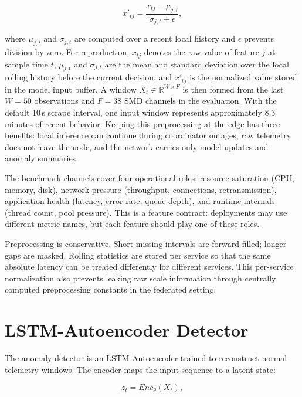 \begin{equation}
    x'_{tj} = \frac{x_{tj} - \mu_{j,t}}{\sigma_{j,t} + \epsilon},
    \label{eq:local_normalization}
\end{equation}

where $\mu_{j,t}$ and $\sigma_{j,t}$ are computed over a recent local history
and $\epsilon$ prevents division by zero. For reproduction, $x_{tj}$ denotes
the raw value of feature $j$ at sample time $t$, $\mu_{j,t}$ and
$\sigma_{j,t}$ are the mean and standard deviation over the local rolling
history before the current decision, and $x'_{tj}$ is the normalized value
stored in the model input buffer. A window
$X_t \in \mathbb{R}^{W \times F}$ is then formed from the last $W=50$
observations and $F=38$ SMD channels in the evaluation. With the default 10\,s
scrape interval, one input window represents approximately 8.3 minutes of recent
behavior. Keeping this preprocessing at the edge has three benefits: local
inference can continue during coordinator outages, raw telemetry does not leave
the node, and the network carries only model updates and anomaly summaries.

The benchmark channels cover four operational roles: resource saturation (CPU,
memory, disk), network pressure (throughput, connections, retransmission),
application health (latency, error rate, queue depth), and runtime internals
(thread count, pool pressure). This is a feature contract: deployments may use
different metric names, but each feature should play one of these roles.

Preprocessing is conservative. Short missing intervals are forward-filled;
longer gaps are masked. Rolling statistics are stored per service so that the
same absolute latency can be treated differently for different services. This
per-service normalization also prevents leaking raw scale information through
centrally computed preprocessing constants in the federated setting.

\section{LSTM-Autoencoder Detector}
\label{sec:method_lstm_ae}

The anomaly detector is an LSTM-Autoencoder trained to reconstruct normal
telemetry windows. The encoder maps the input sequence to a latent state:

\begin{equation}
    z_t = Enc_\theta(X_t),
    \label{eq:encoder}
\end{equation}

